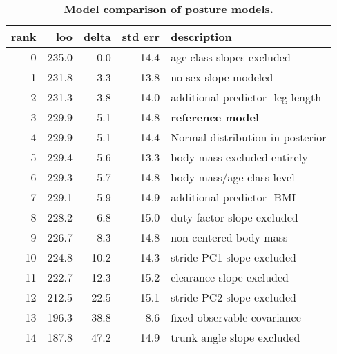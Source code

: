 \begin{table}[p]
\caption{\label{tab:posturemodelcomparison}\textbf{Model comparison of posture models.}}
\centering
\begin{tabular}{rrrrl}
\textbf{rank} & \textbf{loo} & \textbf{delta} & \textbf{std err} & \textbf{description}\\[0pt]
\hline
0 & 235.0 & 0.0 & 14.4 & age class slopes excluded\\[0pt]
1 & 231.8 & 3.3 & 13.8 & no sex slope modeled\\[0pt]
2 & 231.3 & 3.8 & 14.0 & additional predictor- leg length\\[0pt]
3 & 229.9 & 5.1 & 14.8 & \textbf{reference model}\\[0pt]
4 & 229.9 & 5.1 & 14.4 & Normal distribution in posterior\\[0pt]
5 & 229.4 & 5.6 & 13.3 & body mass excluded entirely\\[0pt]
6 & 229.3 & 5.7 & 14.8 & body mass/age class level\\[0pt]
7 & 229.1 & 5.9 & 14.9 & additional predictor- BMI\\[0pt]
8 & 228.2 & 6.8 & 15.0 & duty factor slope excluded\\[0pt]
9 & 226.7 & 8.3 & 14.8 & non-centered body mass\\[0pt]
10 & 224.8 & 10.2 & 14.3 & stride PC1 slope excluded\\[0pt]
11 & 222.7 & 12.3 & 15.2 & clearance slope excluded\\[0pt]
12 & 212.5 & 22.5 & 15.1 & stride PC2 slope excluded\\[0pt]
13 & 196.3 & 38.8 & 8.6 & fixed observable covariance\\[0pt]
14 & 187.8 & 47.2 & 14.9 & trunk angle slope excluded\\[0pt]
\end{tabular}
\end{table}

